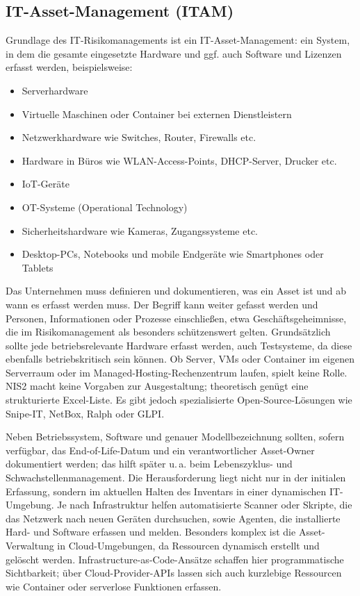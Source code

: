 \newpage
\subsection{IT-Asset-Management (ITAM)}
Grundlage des IT-Risikomanagements ist ein IT-Asset-Management: ein System, in dem die gesamte eingesetzte Hardware und ggf. auch Software und Lizenzen erfasst werden, beispielsweise:
\begin{itemize}
  \item Serverhardware
  \item Virtuelle Maschinen oder Container bei externen Dienstleistern
  \item Netzwerkhardware wie Switches, Router, Firewalls etc.
  \item Hardware in Büros wie WLAN-Access-Points, DHCP-Server, Drucker etc.
  \item IoT-Geräte
  \item OT-Systeme (Operational Technology)
  \item Sicherheitshardware wie Kameras, Zugangssysteme etc.
  \item Desktop-PCs, Notebooks und mobile Endgeräte wie Smartphones oder Tablets
\end{itemize}

Das Unternehmen muss definieren und dokumentieren, was ein Asset ist und ab wann es erfasst werden muss. Der Begriff kann weiter gefasst werden und Personen, Informationen oder Prozesse einschließen, etwa Geschäftsgeheimnisse, die im Risikomanagement als besonders schützenswert gelten. Grundsätzlich sollte jede betriebsrelevante Hardware erfasst werden, auch Testsysteme, da diese ebenfalls betriebskritisch sein können. Ob Server, VMs oder Container im eigenen Serverraum oder im Managed-Hosting-Rechenzentrum laufen, spielt keine Rolle. NIS2 macht keine Vorgaben zur Ausgestaltung; theoretisch genügt eine strukturierte Excel-Liste. Es gibt jedoch spezialisierte Open-Source-Lösungen wie Snipe-IT, NetBox, Ralph oder GLPI.

Neben Betriebssystem, Software und genauer Modellbezeichnung sollten, sofern verfügbar, das End-of-Life-Datum und ein verantwortlicher Asset-Owner dokumentiert werden; das hilft später u.\,a. beim Lebenszyklus- und Schwachstellenmanagement. Die Herausforderung liegt nicht nur in der initialen Erfassung, sondern im aktuellen Halten des Inventars in einer dynamischen IT-Umgebung. Je nach Infrastruktur helfen automatisierte Scanner oder Skripte, die das Netzwerk nach neuen Geräten durchsuchen, sowie Agenten, die installierte Hard- und Software erfassen und melden.
\newpage
Besonders komplex ist die Asset-Verwaltung in Cloud-Umgebungen, da Ressourcen dynamisch erstellt und gelöscht werden. Infrastructure-as-Code-Ansätze schaffen hier programmatische Sichtbarkeit; über Cloud-Provider-APIs lassen sich auch kurzlebige Ressourcen wie Container oder serverlose Funktionen erfassen.

